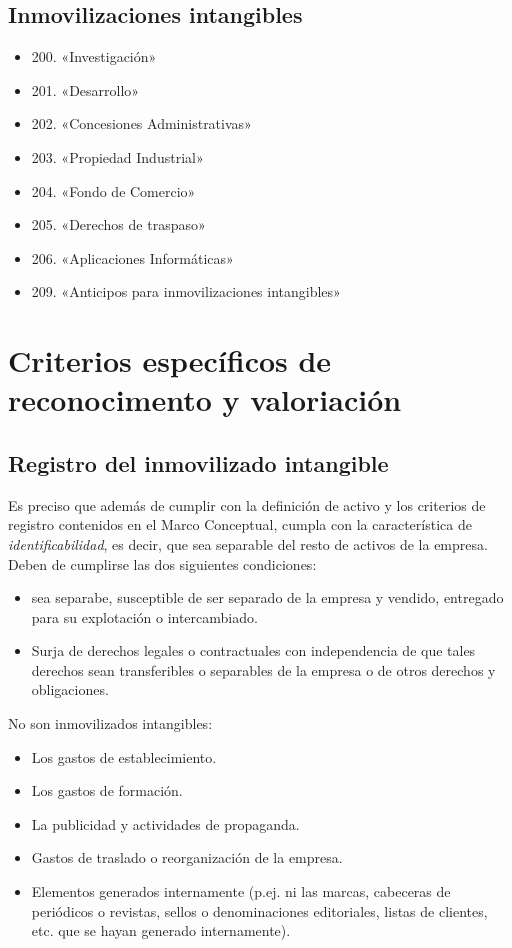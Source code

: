 \documentclass[a4paper,12pt]{article}
\begin{document}
\subsection{Inmovilizaciones intangibles}
\begin{itemize}
        \item 200. «Investigación»
        \item 201. «Desarrollo»
        \item 202. «Concesiones Administrativas»
        \item 203. «Propiedad Industrial»
        \item 204. «Fondo de Comercio»
        \item 205. «Derechos de traspaso»
        \item 206. «Aplicaciones Informáticas»
        \item 209. «Anticipos para inmovilizaciones intangibles»
\end{itemize}

\section{Criterios específicos de reconocimento y valoriación}
\subsection{Registro del inmovilizado intangible}
Es preciso que además de cumplir con la definición de activo y los criterios de registro contenidos en el Marco Conceptual, cumpla con la característica de \textit{identificabilidad}, es decir, que sea separable del resto de activos de la empresa.\\

Deben de cumplirse las dos siguientes condiciones:
\begin{itemize}
    \item sea separabe, susceptible de ser separado de la empresa y vendido, entregado para su explotación o intercambiado.
    \item Surja de derechos legales o contractuales con independencia de que tales derechos sean  transferibles o separables de la empresa o de otros derechos y obligaciones.
\end{itemize}

No son inmovilizados intangibles:
\begin{itemize}
    \item Los gastos de establecimiento.
    \item Los gastos de formación.
    \item La publicidad y actividades de propaganda.
    \item Gastos de traslado o reorganización de la empresa.
    \item Elementos generados internamente (p.ej. ni las marcas, cabeceras de periódicos o revistas, sellos o denominaciones editoriales, listas de clientes, etc. que se hayan generado internamente).
\end{itemize}
\end{document}
